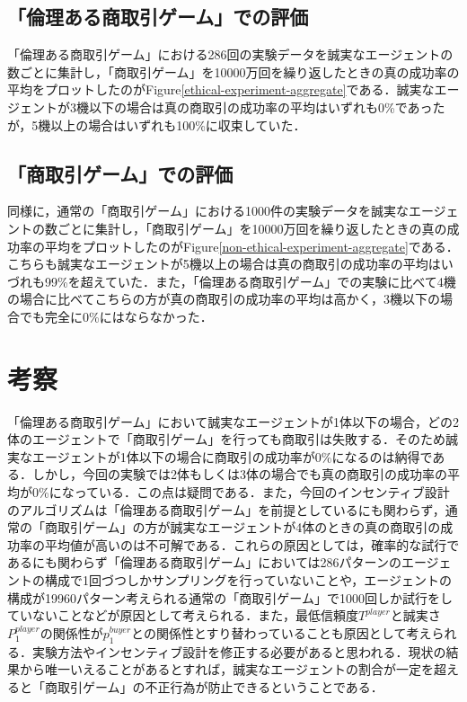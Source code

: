 \documentclass[twocolumn, a4j]{article}
\begin{document}
\subsection{「倫理ある商取引ゲーム」での評価}
「倫理ある商取引ゲーム」における286回の実験データを誠実なエージェントの数ごとに集計し，「商取引ゲーム」を10000万回を繰り返したときの真の成功率の平均をプロットしたのがFigure\ref{ethical-experiment-aggregate}である．誠実なエージェントが3機以下の場合は真の商取引の成功率の平均はいずれも0\%であったが，5機以上の場合はいずれも100\%に収束していた．

\subsection{「商取引ゲーム」での評価}
同様に，通常の「商取引ゲーム」における1000件の実験データを誠実なエージェントの数ごとに集計し，「商取引ゲーム」を10000万回を繰り返したときの真の成功率の平均をプロットしたのがFigure\ref{non-ethical-experiment-aggregate}である．こちらも誠実なエージェントが5機以上の場合は真の商取引の成功率の平均はいづれも99\%を超えていた．また，「倫理ある商取引ゲーム」での実験に比べて4機の場合に比べてこちらの方が真の商取引の成功率の平均は高かく，3機以下の場合でも完全に0\%にはならなかった．

\section{考察}
「倫理ある商取引ゲーム」において誠実なエージェントが1体以下の場合，どの2体のエージェントで「商取引ゲーム」を行っても商取引は失敗する．そのため誠実なエージェントが1体以下の場合に商取引の成功率が0\%になるのは納得である．しかし，今回の実験では2体もしくは3体の場合でも真の商取引の成功率の平均が0\%になっている．この点は疑問である．また，今回のインセンティブ設計のアルゴリズムは「倫理ある商取引ゲーム」を前提としているにも関わらず，通常の「商取引ゲーム」の方が誠実なエージェントが4体のときの真の商取引の成功率の平均値が高いのは不可解である．これらの原因としては，確率的な試行であるにも関わらず「倫理ある商取引ゲーム」においては286パターンのエージェントの構成で1回づつしかサンプリングを行っていないことや，エージェントの構成が19960パターン考えられる通常の「商取引ゲーム」で1000回しか試行をしていないことなどが原因として考えられる．また，最低信頼度$T^{player}$と誠実さ$P^{player}_1$の関係性が$p^{buyer}_1$との関係性とすり替わっていることも原因として考えられる．実験方法やインセンティブ設計を修正する必要があると思われる．現状の結果から唯一いえることがあるとすれば，誠実なエージェントの割合が一定を超えると「商取引ゲーム」の不正行為が防止できるということである．
\end{document}

